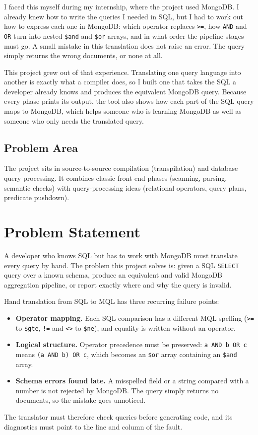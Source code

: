 \documentclass[12pt,a4paper]{report}
\newcommand{\codeus}{\textunderscore\allowbreak}
\DeclareRobustCommand{\code}[1]{\texttt{\let\_\codeus #1}}
\begin{document}
I faced this myself during my internship, where the project used MongoDB. I already knew how to write the queries I needed in SQL, but I had to work out how to express each one in MongoDB: which operator replaces \code{>=}, how \code{AND} and \code{OR} turn into nested \code{\$and} and \code{\$or} arrays, and in what order the pipeline stages must go. A small mistake in this translation does not raise an error. The query simply returns the wrong documents, or none at all.

This project grew out of that experience. Translating one query language into another is exactly what a compiler does, so I built one that takes the SQL a developer already knows and produces the equivalent MongoDB query. Because every phase prints its output, the tool also shows how each part of the SQL query maps to MongoDB, which helps someone who is learning MongoDB as well as someone who only needs the translated query.

\section{Problem Area}
The project sits in source-to-source compilation (transpilation) and database query processing. It combines classic front-end phases (scanning, parsing, semantic checks) with query-processing ideas (relational operators, query plans, predicate pushdown).

\chapter{Problem Statement}
A developer who knows SQL but has to work with MongoDB must translate every query by hand. The problem this project solves is: given a SQL \code{SELECT} query over a known schema, produce an equivalent and valid MongoDB aggregation pipeline, or report exactly where and why the query is invalid.

Hand translation from SQL to MQL has three recurring failure points:
\begin{itemize}
  \item \textbf{Operator mapping.} Each SQL comparison has a different MQL spelling (\code{>=} to \code{\$gte}, \code{!=} and \code{<>} to \code{\$ne}), and equality is written without an operator.
  \item \textbf{Logical structure.} Operator precedence must be preserved: \code{a AND b OR c} means \code{(a AND b) OR c}, which becomes an \code{\$or} array containing an \code{\$and} array.
  \item \textbf{Schema errors found late.} A misspelled field or a string compared with a number is not rejected by MongoDB. The query simply returns no documents, so the mistake goes unnoticed.
\end{itemize}
The translator must therefore check queries before generating code, and its diagnostics must point to the line and column of the fault.
\end{document}
